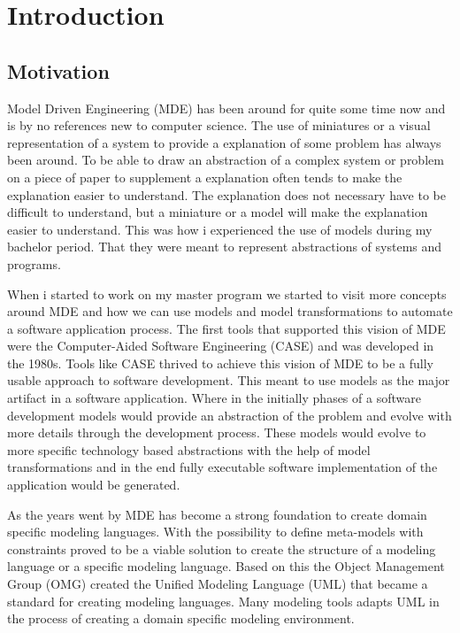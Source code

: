 \chapter{Introduction} %

\label{introduction} %

\singlespacing

\section{Motivation}

Model Driven Engineering (MDE) has been around for quite some time now and is by
no references new to computer science. The use of miniatures or a visual
representation of a system to provide a explanation of some problem has always
been around. To be able to draw an abstraction of a complex system or problem
on a piece of paper to supplement a explanation often tends to make the explanation
easier to understand. The explanation does not necessary have to be difficult
to understand, but a miniature or a model will make the explanation easier to
understand. This was how i experienced the use of models during my bachelor
period. That they were meant to represent abstractions of systems and programs. 

When i started to work on my master program we started to visit more concepts
around MDE and how we can use models and model transformations to automate a
software application process. The first tools that supported this vision of MDE
were the Computer-Aided Software Engineering (CASE) and was developed in the
1980s. Tools like CASE thrived to achieve this vision of MDE to be a fully
usable approach to software development. This meant to use models as the major
artifact in a software application. Where in the initially phases of a
software development models would provide an abstraction of the problem and
evolve with more details through the development process. These models would
evolve to more specific technology based abstractions with the help of model
transformations and in the end fully executable software implementation of the
application would be generated.

As the years went by MDE has become a strong foundation to create domain
specific modeling languages. With the possibility to define meta-models with
constraints proved to be a viable solution to create the structure of a
modeling language or a specific modeling language. Based on this the Object
Management Group (OMG) created the Unified Modeling Language\cite{UML_SPEC}
(UML) that became a standard for creating modeling languages. Many modeling
tools adapts UML in the process of creating a domain specific modeling
environment.

